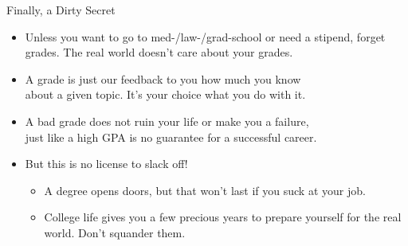 \documentclass[professionalfonts, xcolor={usenames,svgnames,x11names,table}]{beamer}
\begin{document}
\begin{frame}{Finally, a Dirty Secret}

    \medskip
    \begin{itemize}
        \item Unless you want to go to med-\slash law-\slash grad-school or need a stipend, forget grades.
              The real world doesn't care about your grades.
        \item A grade is just our feedback to you how much you know\\
            about a given topic.
            It's your choice what you do with it.
        \item A bad grade does not ruin your life or make you a failure,\\
            just like a high GPA is no guarantee for a successful career.
        \item But this is no license to slack off!
            \begin{itemize}
                \item A degree opens doors, but that won't last if you suck at your job.
                \item College life gives you a few precious years to prepare yourself for the real world.
                    Don't squander them.
            \end{itemize}
    \end{itemize}
\end{frame}
\end{document}
